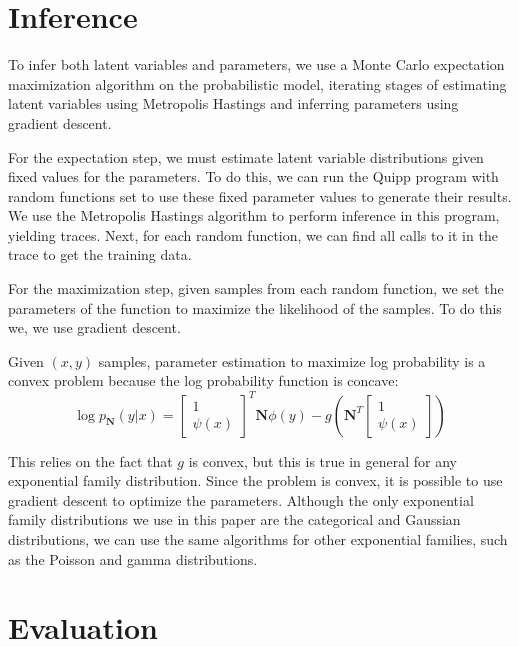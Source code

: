 \documentclass{article}
\begin{document}
  \section{Inference}

    To infer both latent variables and parameters, we use a Monte Carlo
    expectation maximization algorithm \cite{mcem} on the probabilistic model, iterating stages of
    estimating latent variables using Metropolis Hastings and inferring
    parameters using gradient descent.

    For the expectation step, we must estimate latent variable distributions given
    fixed values for the parameters.  To do this, we can run the Quipp program
    with random functions set to use these fixed parameter values to generate their results.
    We use the Metropolis Hastings algorithm to perform inference in this program,
    yielding traces.  Next, for each random function, we can find all calls
    to it in the trace to get the training data.

    For the maximization step, given samples from each random function, we set the
    parameters of the function to maximize the likelihood of the samples.  To do this we,
    we use gradient descent.

    Given $(x, y)$ samples, parameter estimation to maximize log probability is a convex
    problem because the log probability function is concave:
    $$\log p_{\mathbf{N}}(y | x) = \begin{bmatrix} 1 \\ \psi(x) \end{bmatrix} ^T \mathbf{N} \phi(y) - g\left(\mathbf{N}^T \begin{bmatrix} 1 \\ \psi(x) \end{bmatrix}\right)$$

    This relies on the fact that $g$ is convex, but this is true in general for any exponential family distribution.
    Since the problem is convex, it is possible to use gradient descent to optimize the parameters.  Although
    the only exponential family distributions we use in this paper are the categorical and Gaussian distributions,
    we can use the same algorithms for other exponential families, such as the Poisson and gamma distributions.

  \section{Evaluation}
\end{document}
